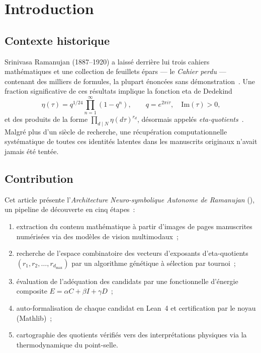 \section{Introduction}
\label{sec:introduction}

\subsection{Contexte historique}

Srinivasa Ramanujan (1887--1920) a laissé derrière lui trois cahiers mathématiques et une collection de feuillets épars --- le \emph{Cahier perdu} --- contenant des milliers de formules, la plupart énoncées sans démonstration~\cite{ramanujan_lost,andrews_berndt_I}. Une fraction significative de ces résultats implique la fonction eta de Dedekind
\begin{equation}
  \label{eq:dedekind_eta}
  \eta(\tau) = q^{1/24} \prod_{n=1}^{\infty} (1 - q^n), \qquad q = e^{2\pi i \tau},\quad \mathrm{Im}(\tau) > 0,
\end{equation}
et des produits de la forme $\prod_{d \mid N} \eta(d\tau)^{r_d}$, désormais appelés \emph{eta-quotients}~\cite{ono2004,martin_1996}. Malgré plus d'un siècle de recherche, une récupération computationnelle systématique de toutes ces identités latentes dans les manuscrits originaux n'avait jamais été tentée.

\subsection{Contribution}

Cet article présente l'\emph{Architecture Neuro-symbolique Autonome de Ramanujan} (\RAMA{}), un pipeline de découverte en cinq étapes~:
\begin{enumerate}[label=(\roman*)]
  \item extraction du contenu mathématique à partir d'images de pages manuscrites numérisées via des modèles de vision multimodaux~;
  \item recherche de l'espace combinatoire des vecteurs d'exposants d'eta-quotients $(r_1, r_2, \ldots, r_{d_{\max}})$ par un algorithme génétique à sélection par tournoi~;
  \item évaluation de l'adéquation des candidats par une fonctionnelle d'énergie composite $E = \alpha C + \beta I + \gamma D$~;
  \item auto-formalisation de chaque candidat en Lean~4 et certification par le noyau (Mathlib)~;
  \item cartographie des quotients vérifiés vers des interprétations physiques via la thermodynamique du point-selle.
\end{enumerate}

